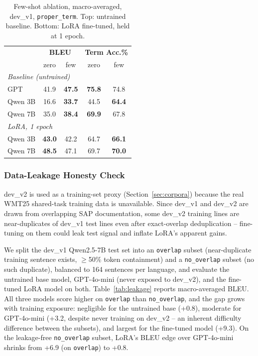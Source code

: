\documentclass[11pt]{article}
\begin{document}
\begin{table}[t]
  \centering
  \small
  \begin{tabular}{lcccc}
    \hline
    & \multicolumn{2}{c}{\textbf{BLEU}} & \multicolumn{2}{c}{\textbf{Term Acc.\%}} \\
    & zero & few & zero & few \\
    \hline
    \multicolumn{5}{l}{\emph{Baseline (untrained)}} \\
    GPT        & 41.9 & \textbf{47.5} & \textbf{75.8} & 74.8 \\
    Qwen 3B    & 16.6 & \textbf{33.7} & 44.5 & \textbf{64.4} \\
    Qwen 7B    & 35.0 & \textbf{38.4} & \textbf{69.9} & 67.8 \\
    \hline
    \multicolumn{5}{l}{\emph{LoRA, 1 epoch}} \\
    Qwen 3B    & \textbf{43.0} & 42.2 & 64.7 & \textbf{66.1} \\
    Qwen 7B    & \textbf{48.5} & 47.1 & 69.7 & \textbf{70.0} \\
    \hline
  \end{tabular}
  \caption{Few-shot ablation, macro-averaged, dev\_v1, \texttt{proper\_term}. Top: untrained baseline. Bottom: LoRA fine-tuned, held at 1 epoch.}
  \label{tab:few-shot}
\end{table}

\subsubsection{Data-Leakage Honesty Check}
\label{sec:exp-leakage}

dev\_v2 is used as a training-set proxy (Section~\ref{sec:corpora}) because the real WMT25 shared-task training data is unavailable. Since dev\_v1 and dev\_v2 are drawn from overlapping SAP documentation, some dev\_v2 training lines are near-duplicates of dev\_v1 test lines even after exact-overlap deduplication -- fine-tuning on them could leak test signal and inflate LoRA's apparent gains.

We split the dev\_v1 Qwen2.5-7B test set into an \texttt{overlap} subset (near-duplicate training sentence exists, $\geq$50\% token containment) and a \texttt{no\_overlap} subset (no such duplicate), balanced to 164 sentences per language, and evaluate the untrained base model, GPT-4o-mini (never exposed to dev\_v2), and the fine-tuned LoRA model on both. Table~\ref{tab:leakage} reports macro-averaged BLEU. All three models score higher on \texttt{overlap} than \texttt{no\_overlap}, and the gap grows with training exposure: negligible for the untrained base (+0.8), moderate for GPT-4o-mini (+3.2, despite never training on dev\_v2 -- an inherent difficulty difference between the subsets), and largest for the fine-tuned model (+9.3). On the leakage-free \texttt{no\_overlap} subset, LoRA's BLEU edge over GPT-4o-mini shrinks from +6.9 (on \texttt{overlap}) to +0.8.
\end{document}

